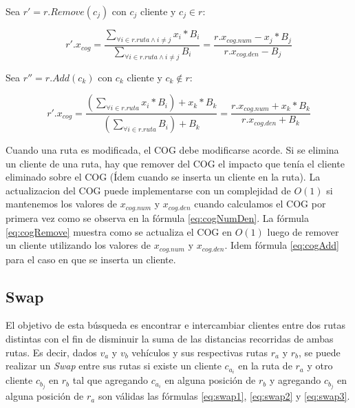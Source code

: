 \bigskip

Sea $r' = r.Remove(c_j)$ con $c_j$ cliente y $c_j \in r$:

\begin{equation} \label{eq:cogRemove}
r'.x_{cog} =  \frac{\sum_{\forall i \in r.ruta \wedge i \neq j} x_i * B_i}{\sum_{\forall i \in r.ruta \wedge i \neq j} B_i}  = \frac{r.x_{cog.num}-x_j*B_j}{r.x_{cog.den}-B_j}
\end{equation}

\bigskip

Sea $r'' = r.Add(c_k)$ con $c_k$ cliente y $c_k \notin r$:

\begin{equation} \label{eq:cogAdd}
r'.x_{cog} =  \frac{(\sum_{\forall i \in r.ruta} x_i * B_i) + x_k * B_k}{(\sum_{\forall i \in r.ruta} B_i) + B_k}  = \frac{r.x_{cog.num}+x_k*B_k}{r.x_{cog.den}+B_k}
\end{equation}

\bigskip

Cuando una ruta es modificada, el COG debe modificarse acorde. Si se elimina un cliente de una ruta, hay que remover del COG el impacto que tenía el cliente eliminado sobre el COG (Ídem cuando se inserta un cliente en la ruta). La actualizacion del COG puede implementarse con un complejidad de $O(1)$ si mantenemos los valores de $x_{cog.num}$ y $x_{cog.den}$ cuando calculamos el COG por primera vez como se observa en la fórmula \ref{eq:cogNumDen}. La fórmula \ref{eq:cogRemove} muestra como se actualiza el COG en $O(1)$ luego de remover un cliente utilizando los valores de $x_{cog.num}$ y $x_{cog.den}$. Idem fórmula \ref{eq:cogAdd} para el caso en que se inserta un cliente.

\bigskip


\subsection{Swap}

El objetivo de esta búsqueda es encontrar e intercambiar clientes entre dos rutas distintas con el fin de disminuir la suma de las distancias recorridas de ambas rutas. Es decir, dados $v_a$ y $v_b$ vehículos y sus respectivas rutas $r_a$ y $r_b$, se puede realizar un \textit{Swap} entre sus rutas si existe un cliente $c_{a_i}$ en la ruta de $r_a$ y otro cliente $c_{b_j}$ en $r_b$ tal que agregando $c_{a_i}$ en alguna posición de $r_b$ y agregando $c_{b_j}$ en alguna posición de $r_a$ son válidas las fórmulas \ref{eq:swap1}, \ref{eq:swap2} y \ref{eq:swap3}.

